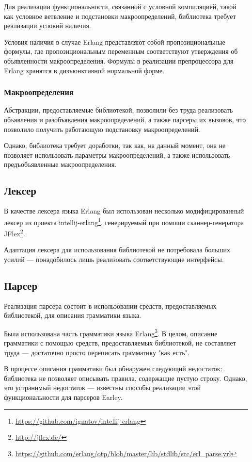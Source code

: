 Для реализации функциональности, связанной с условной компиляцией, такой как условное ветвление и подстановки макроопределений, библиотека требует реализации условий наличия.

Условия наличия в случае Erlang представляют собой пропозициональные формулы, где пропозициональным переменным соответствуют утверждения об объявленности макроопределения. Формулы в реализации препроцессора для Erlang хранятся в дизъюнктивной нормальной форме.

\subsubsection{Макроопределения}

Абстракции, предоставляемые библиотекой, позволили без труда реализовать объявления и разобъявления макроопределений, а также парсеры их вызовов, что позволило получить работающую подстановку макроопределений.

Однако, библиотека требует доработки, так как, на данный момент, она не позволяет использовать параметры макроопределений, а также использовать предъобъявленные макроопределения.

\subsection{Лексер}

В качестве лексера языка Erlang был использован несколько модифицированный лексер из проекта intellij-erlang\footnote{\url{https://github.com/ignatov/intellij-erlang}}, генерируемый при помощи сканнер-генератора JFlex\footnote{\url{http://jflex.de/}}.

Адаптация лексера для использования библиотекой не потребовала больших усилий --- понадобилось лишь реализовать соответствующие интерфейсы.

\subsection{Парсер}

Реализация парсера состоит в использовании средств, предоставляемых библиотекой, для описания грамматики языка.

Была использована часть грамматики языка Erlang\footnote{\url{https://github.com/erlang/otp/blob/master/lib/stdlib/src/erl\_parse.yrl}}. В целом, описание грамматики с помощью средств, предоставляемых библиотекой, не составляет труда --- достаточно просто переписать грамматику "как есть".

В процессе описания грамматики был обнаружен следующий недостаток: библиотека не позволяет описывать правила, содержащие пустую строку. Однако, это устранимый недостаток --- известны способы реализации этой функциональности для парсеров Earley\cite{emptyrules}.

